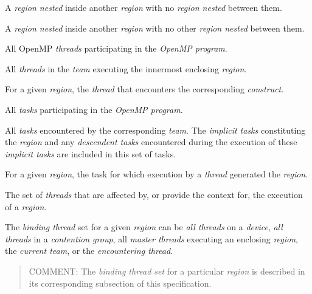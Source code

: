 \glossarydefstart
A \emph{region nested} inside another \emph{region} with no  
\emph{region nested} between them.
\glossarydefend

\glossarydefstart
A \emph{region nested} inside another \emph{region} with no other 
\emph{region nested} between them.
\glossarydefend

\glossarydefstart
All OpenMP \emph{threads} participating in the \emph{OpenMP program}.
\glossarydefend

\glossarydefstart
All \emph{threads} in the \emph{team} executing the innermost 
enclosing  \emph{region}.
\glossarydefend

\glossarydefstart
For a given \emph{region}, the \emph{thread} that encounters the
corresponding \emph{construct}.
\glossarydefend

\glossarydefstart
All \emph{tasks} participating in the \emph{OpenMP program}.
\glossarydefend

\glossarydefstart
All \emph{tasks} encountered by the corresponding \emph{team}. The 
\emph{implicit tasks} constituting the  \emph{region} 
and any \emph{descendent tasks} encountered during the execution of 
these \emph{implicit tasks} are included in this set of tasks.
\glossarydefend

\glossarydefstart
For a given \emph{region}, the task for which execution by a 
\emph{thread} generated the \emph{region}.
\glossarydefend

\glossarydefstart
The set of \emph{threads} that are affected by, or provide the context 
for, the execution of a \emph{region}.

The \emph{binding thread} set for a given \emph{region} can be 
\emph{all threads} on a \emph{device}, \emph{all threads} in a 
\emph{contention group}, all \emph{master threads} executing an
enclosing  \emph{region}, the \emph{current team}, 
or the \emph{encountering thread}.

\begin{quote}
COMMENT: The \emph{binding thread set} for a particular \emph{region} 
is described in its corresponding subsection of this specification.
\end{quote}
\glossarydefend

